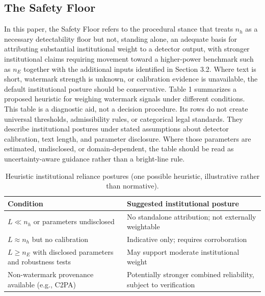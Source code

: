 \documentclass[11pt]{article}
\begin{document}
\subsection{The Safety Floor}
In this paper, the Safety Floor refers to the procedural stance that treats $n_h$ as
a necessary detectability floor but not, standing alone, an adequate basis for
attributing substantial institutional weight to a detector output, with stronger
institutional claims requiring movement toward a higher-power benchmark such as
$n_E$ together with the additional inputs identified in Section 3.2. Where text is
short, watermark strength is unknown, or calibration evidence is unavailable, the
default institutional posture should be conservative.
Table 1 summarizes a proposed heuristic for weighing watermark signals under
different conditions. This table is a diagnostic aid, not a decision procedure. Its
rows do not create universal thresholds, admissibility rules, or categorical legal
standards. They describe institutional postures under stated assumptions about
detector calibration, text length, and parameter disclosure. Where those parameters
are estimated, undisclosed, or domain-dependent, the table should be read as
uncertainty-aware guidance rather than a bright-line rule.
\begin{table}[h]
\centering
\caption{Heuristic institutional reliance postures (one possible heuristic,
illustrative rather than normative).}
\begin{tabular}{p{}p{}}
\toprule
\textbf{Condition} & \textbf{Suggested institutional posture}\\
\midrule
$L \ll n_h$ or parameters undisclosed & No standalone attribution; not externally
weightable\\
$L \approx n_h$ but no calibration & Indicative only; requires corroboration\\
$L \geq n_E$ with disclosed parameters and robustness tests & May support moderate
institutional weight\\
Non-watermark provenance available (e.g., C2PA) & Potentially stronger combined
reliability, subject to verification\\
\bottomrule
\end{tabular}
\end{table}
\end{document}
